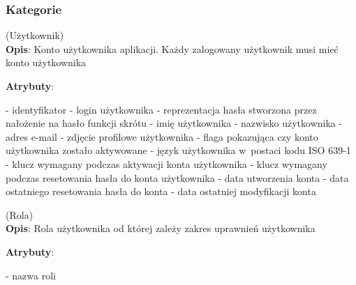 \subsubsection{Kategorie}\label{subsubsec:database:gateway:categories}

\begin{enumerate}[label={\textbf{KAT/0/\protect\twodigits{\theenumi}}}, wide, labelwidth=!, labelindent=0pt, labelsep=0pt, series=reqs]
    \setlength\itemsep{1.75em}
    \label{kat:User} (Użytkownik)\\
    \indent\textbf{Opis}: Konto użytkownika aplikacji. Każdy zalogowany użytkownik musi mieć konto użytkownika
    \par
    \textbf{Atrybuty}:
    \begin{itemize}[series=atr, wide, align=left, leftmargin=190pt]
        \label{kat:User:id}- identyfikator
        \label{kat:User:login}- login użytkownika
        \label{kat:User:passwordHash}- reprezentacja hasła stworzona przez nałożenie na hasło funkcji skrótu
        \label{kat:User:firstName}- imię użytkownika
        \label{kat:User:lastName}- nazwisko użytkownika
        \label{kat:User:email}- adres e-mail
        \label{kat:User:image}- zdjęcie profilowe użytkownika
        \label{kat:User:activated}- flaga pokazująca czy konto użytkownika zostało aktywowane
        \label{kat:User:language}- język użytkownika w~postaci kodu ISO 639-1
        \label{kat:User:activationKey}- klucz wymagany podczas aktywacji konta użytkownika
        \label{kat:User:resetKey}- klucz wymagany podczas resetowania hasła do konta użytkownika
        \label{kat:User:createdDate}- data utworzenia konta
        \label{kat:User:resetDate}- data ostatniego resetowania hasła do konta
        \label{kat:User:lastModifiedDate}- data ostatniej modyfikacji konta
    \end{itemize}

    \label{kat:Authority} (Rola)\\
    \indent\textbf{Opis}: Rola użytkownika od której zależy zakres uprawnień użytkownika
    \par
    \textbf{Atrybuty}:
    \begin{itemize}[series=atr, wide, align=left, leftmargin=190pt]
        \label{kat:Authority:name}- nazwa roli
    \end{itemize}


\end{enumerate}
